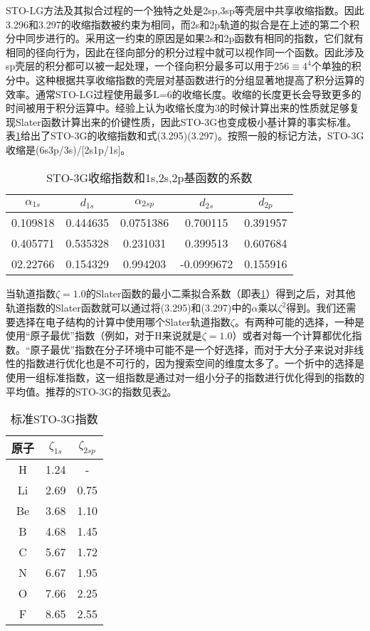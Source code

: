 STO-LG方法及其拟合过程的一个独特之处是2sp,3sp等壳层中共享收缩指数。因此3.296和3.297的收缩指数被约束为相同，而2s和2p轨道的拟合是在上述的第二个积分中同步进行的。采用这一约束的原因是如果2s和2p函数有相同的指数，它们就有相同的径向行为，因此在径向部分的积分过程中就可以视作同一个函数。因此涉及sp壳层的积分都可以被一起处理，一个径向积分最多可以用于$256\equiv 4^4$个单独的积分中。这种根据共享收缩指数的壳层对基函数进行的分组显著地提高了积分运算的效率。通常STO-LG过程使用最多L=6的收缩长度。收缩的长度更长会导致更多的时间被用于积分运算中。经验上认为收缩长度为3的时候计算出来的性质就足够复现Slater函数计算出来的价键性质，因此STO-3G也变成极小基计算的事实标准。表\ref{t3.7}给出了STO-3G的收缩指数和式(3.295)(3.297)。按照一般的标记方法，STO-3G收缩是(6s3p/3s)/[2s1p/1s]。
\begin{table}[h]
	\centering\caption{STO-3G收缩指数和1s,2s,2p基函数的系数}
	\begin{tabular}{ccccc}
		\hline
		$\alpha_{1s}$&$d_{1s}$&$\alpha_{2sp}$&$d_{2s}$&$d_{2p}$\\\hline
		0.109818	 &0.444635&0.0751386	 &0.700115&0.391957\\
		0.405771	 &0.535328&0.231031	 &0.399513&0.607684\\
		02.22766	 &0.154329&0.994203	 &-0.0999672&0.155916\\
		\hline
	\end{tabular}
\label{t3.7}
\end{table}
当轨道指数$\zeta = 1.0$的Slater函数的最小二乘拟合系数（即表\ref{t3.7}）得到之后，对其他轨道指数的Slater函数就可以通过将(3.295)和(3.297)中的$\alpha$乘以$\zeta^2$得到。我们还需要选择在电子结构的计算中使用哪个Slater轨道指数$\zeta$。有两种可能的选择，一种是使用“原子最优”指数（例如，对于H来说就是$\zeta=1.0$）或者对每一个计算都优化指数。“原子最优”指数在分子环境中可能不是一个好选择，而对于大分子来说对非线性的指数进行优化也是不可行的，因为搜索空间的维度太多了。一个折中的选择是使用一组标准指数，这一组指数是通过对一组小分子的指数进行优化得到的指数的平均值。推荐的STO-3G的指数见表\ref{t3.8}。
\begin{table}[h]
	\centering\caption{标准STO-3G指数}
	\begin{tabular}{ccc}
		\hline
		原子&$\zeta_{1s}$&$\zeta_{2sp}$\\\hline
		H	 &1.24&-\\
		Li	 &2.69&0.75\\		
		Be	 &3.68&1.10\\
		B	 &4.68&1.45\\
		C	 &5.67&1.72\\
		N	 &6.67&1.95\\		
		O	 &7.66&2.25\\
		F	 &8.65&2.55\\
		\hline
	\end{tabular}
\label{t3.8}
\end{table}

